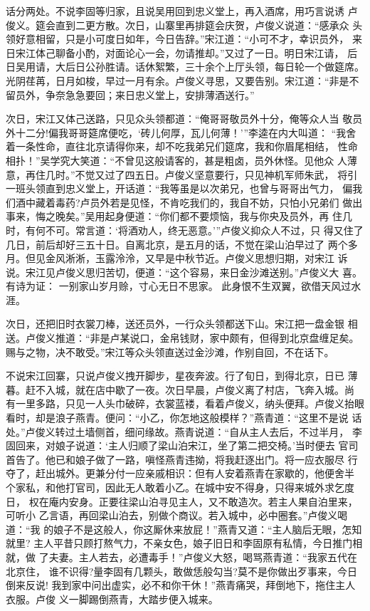 话分两处。不说李固等归家，且说吴用回到忠义堂上，再入酒席，用巧言说诱
卢俊义。筵会直到二更方散。次日，山寨里再排筵会庆贺，卢俊义说道：“感承众
头领好意相留，只是小可度日如年，今日告辞。”宋江道：“小可不才，幸识员外，
来日宋江体己聊备小酌，对面论心一会，勿请推却。”又过了一日。明日宋江请，
后日吴用请，大后日公孙胜请。话休絮繁，三十余个上厅头领，每日轮一个做筵席。
光阴荏苒，日月如梭，早过一月有余。卢俊义寻思，又要告别。宋江道：“非是不
留员外，争奈急急要回；来日忠义堂上，安排薄酒送行。”

次日，宋江又体己送路，只见众头领都道：“俺哥哥敬员外十分，俺等众人当
敬员外十二分!偏我哥哥筵席便吃，‘砖儿何厚，瓦儿何薄！’”李逵在内大叫道：
“我舍着一条性命，直往北京请得你来，却不吃我弟兄们筵席，我和你眉尾相结，
性命相扑！”吴学究大笑道：“不曾见这般请客的，甚是粗卤，员外休怪。见他众
人薄意，再住几时。”不觉又过了四五日。卢俊义坚意要行，只见神机军师朱武，
将引一班头领直到忠义堂上，开话道：“我等虽是以次弟兄，也曾与哥哥出气力，
偏我们酒中藏着毒药?卢员外若是见怪，不肯吃我们的，我自不妨，只怕小兄弟们
做出事来，悔之晚矣。”吴用起身便道：“你们都不要烦恼，我与你央及员外，再
住几时，有何不可。常言道：‘将酒劝人，终无恶意。’”卢俊义抑众人不过，只
得又住了几日，前后却好三五十日。自离北京，是五月的话，不觉在梁山泊早过了
两个多月。但见金风淅淅，玉露泠泠，又早是中秋节近。卢俊义思想归期，对宋江
诉说。宋江见卢俊义思归苦切，便道：“这个容易，来日金沙滩送别。”卢俊义大
喜。有诗为证：
一别家山岁月赊，寸心无日不思家。
此身恨不生双翼，欲借天风过水涯。

次日，还把旧时衣裳刀棒，送还员外，一行众头领都送下山。宋江把一盘金银
相送。卢俊义推道：“非是卢某说口，金帛钱财，家中颇有，但得到北京盘缠足矣。
赐与之物，决不敢受。”宋江等众头领直送过金沙滩，作别自回，不在话下。

不说宋江回寨，只说卢俊义拽开脚步，星夜奔波。行了旬日，到得北京，日已
薄暮。赶不入城，就在店中歇了一夜。次日早晨，卢俊义离了村店，飞奔入城。尚
有一里多路，只见一人头巾破碎，衣裳蓝褛，看着卢俊义，纳头便拜。卢俊义抬眼
看时，却是浪子燕青。便问：“小乙，你怎地这般模样？”燕青道：“这里不是说
话处。”卢俊义转过土墙侧首，细问缘故。燕青说道：“自从主人去后，不过半月，
李固回来，对娘子说道：‘主人归顺了梁山泊宋江，坐了第二把交椅。’当时便去
官司首告了。他已和娘子做了一路，嗔怪燕青违拗，将我赶逐出门。将一应衣服尽
行夺了，赶出城外。更兼分付一应亲戚相识：但有人安着燕青在家歇的，他便舍半
个家私，和他打官司，因此无人敢着小乙。在城中安不得身，只得来城外求乞度日，
权在庵内安身。正要往梁山泊寻见主人，又不敢造次。若主人果自泊里来，可听小
乙言语，再回梁山泊去，别做个商议。若入城中，必中圈套。”卢俊义喝道：“我
的娘子不是这般人，你这厮休来放屁！”燕青又道：“主人脑后无眼，怎知就里?
主人平昔只顾打熬气力，不亲女色，娘子旧日和李固原有私情，今日推门相就，做
了夫妻。主人若去，必遭毒手！”卢俊义大怒，喝骂燕青道：“我家五代在北京住，
谁不识得?量李固有几颗头，敢做恁般勾当?莫不是你做出歹事来，今日倒来反说!
我到家中问出虚实，必不和你干休！”燕青痛哭，拜倒地下，拖住主人衣服。卢俊
义一脚踢倒燕青，大踏步便入城来。

